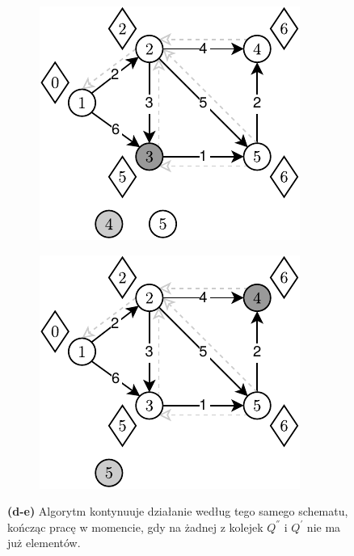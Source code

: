 \begin{figure}[!htbp]
	\ContinuedFloat
	\centering
	\begin{subfigure}[b]{0.3\textwidth}
		\includegraphics[width=\textwidth]{Chapter_III/GRAPH-GROWTH-2Q-Example/d.pdf}
		\caption{}
	\end{subfigure}
	\qquad	\qquad
	\begin{subfigure}[b]{0.3\textwidth}
		\includegraphics[width=\textwidth]{Chapter_III/GRAPH-GROWTH-2Q-Example/e.pdf}
		\caption{}
	\end{subfigure}
	\caption{ \textbf{(d-e)} Algorytm kontynuuje działanie według tego samego schematu, kończąc pracę w momencie, gdy na żadnej z kolejek $Q^{''}$ i $Q^{'}$ nie ma już elementów. } \label{fig:exampleDQQ2}
\end{figure}


